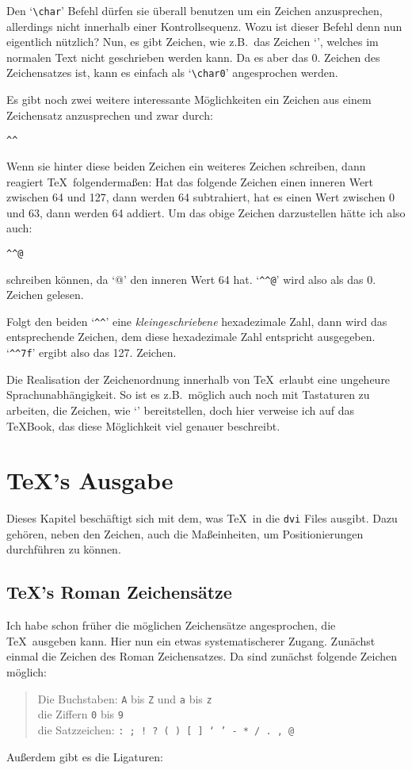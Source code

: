 Den `\verb|\char|' Befehl d\"urfen sie \"uberall benutzen um ein Zeichen
anzusprechen, allerdings nicht innerhalb einer Kontrollsequenz. Wozu
ist dieser Befehl denn nun eigentlich n\"utzlich? Nun, es gibt Zeichen,
wie z.B.\ das Zeichen `', welches im normalen Text nicht
geschrieben werden kann. Da es aber das 0. Zeichen des Zeichensatzes
ist, kann es einfach als `\verb|\char0|' angesprochen werden.

Es gibt noch zwei weitere interessante M\"oglichkeiten ein Zeichen aus
einem Zeichensatz an\-zu\-spre\-chen und zwar durch:
\begin{verbatim}
^^
\end{verbatim}
Wenn sie hinter diese beiden Zeichen ein weiteres Zeichen schreiben,
dann reagiert \TeX\ folgenderma\ss{}en: Hat das folgende Zeichen einen
inneren Wert zwischen 64 und 127, dann werden 64 subtrahiert, hat es
einen Wert zwischen 0 und 63, dann werden 64 addiert. Um das obige
Zeichen darzustellen h\"atte ich also auch:
\begin{verbatim}
^^@
\end{verbatim}
schreiben k\"onnen, da `@' den inneren Wert 64 hat. `\verb|^^@|' wird
also als das 0. Zeichen gelesen.

Folgt den beiden `\verb|^^|' eine {\em kleingeschriebene}
hexadezimale
Zahl, dann wird das entsprechende Zeichen, dem diese hexadezimale Zahl
entspricht ausgegeben. `\verb|^^7f|' ergibt also das 127. Zeichen.

Die Realisation der Zeichenordnung innerhalb von \TeX\ erlaubt eine
ungeheure Sprachunabh\"angigkeit. So ist es z.B.\ m\"oglich auch noch mit
Tastaturen zu arbeiten, die Zeichen, wie `\char26' bereitstellen, doch
hier verweise ich auf das \TeX Book, das diese M\"oglichkeit viel
genauer beschreibt.
\chapter{\TeX's Ausgabe}
Dieses Kapitel besch\"aftigt sich mit dem, was \TeX\ in die {\tt dvi}
\index{File!DVI}Files ausgibt. Dazu geh\"oren, neben den Zeichen, auch die
\index{Einheit!Mass@Einheit!Ma\ss{}}Ma\ss{}einheiten,
um Positionierungen durchf\"uhren zu k\"onnen.
\section{\TeX's Roman Zeichens\"atze}
Ich habe schon fr\"uher die m\"oglichen Zeichens\"atze angesprochen, die
\TeX\ ausgeben kann. Hier nun ein etwas systematischerer Zugang.
Zun\"achst einmal die Zeichen des Roman Zeichensatzes. Da sind zun\"achst
folgende Zeichen m\"oglich:
\begin{quote}
Die Buchstaben: {\tt A} bis {\tt Z} und {\tt a} bis {\tt z}\\
die Ziffern {\tt 0} bis {\tt 9}\\
die Satzzeichen: {\tt : ; ! ? ( ) [ ] ` ' - * / . , @}
\end{quote}
Au\ss{}erdem gibt es die Ligaturen:\medskip

